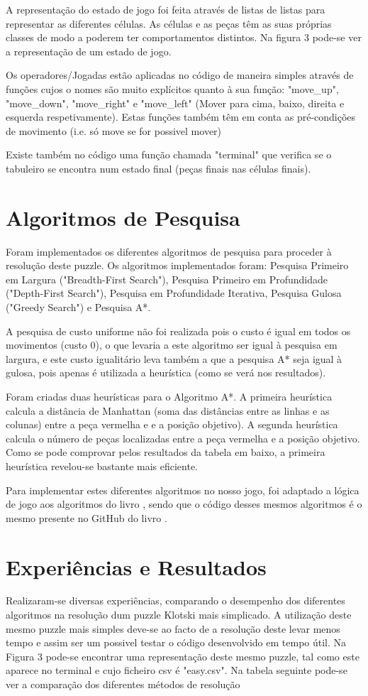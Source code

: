 \documentclass[conference]{IEEEtran}
\begin{document}
A representação do estado de jogo foi feita através de listas de listas para representar as diferentes células. As células e as peças têm as suas próprias classes de modo a poderem ter comportamentos distintos. Na figura 3 pode-se ver a representação de um estado de jogo.

Os operadores/Jogadas estão aplicadas no código de maneira simples através de funções cujos o nomes são muito explícitos quanto à sua função: "move\_up", "move\_down", "move\_right" e "move\_left" (Mover para cima, baixo, direita e esquerda respetivamente). Estas funções também têm em conta as pré-condições de movimento (i.e. só move se for possivel mover)

Existe também no código uma função chamada "terminal" que verifica se o tabuleiro se encontra num estado final (peças finais nas células finais).


\section{Algoritmos de Pesquisa}
Foram implementados os diferentes algoritmos de pesquisa para proceder à resolução deste puzzle. Os algoritmos implementados foram: Pesquisa Primeiro em Largura ("Breadth-First Search"), Pesquisa Primeiro em Profundidade ("Depth-First Search"), Pesquisa em Profundidade Iterativa, Pesquisa Gulosa ("Greedy Search") e Pesquisa A*. 

A pesquisa de custo uniforme não foi realizada pois o custo é igual em todos os movimentos (custo 0), o que levaria a este algoritmo ser igual à pesquisa em largura, e este custo igualitário leva também a que a pesquisa A* seja igual à gulosa, pois apenas é utilizada a heurística (como se verá nos resultados). 

Foram criadas duas heurísticas para o Algoritmo A*. A primeira heurística calcula a distância de Manhattan (soma das distâncias entre as linhas e as colunas) entre a peça vermelha e  e a posição objetivo). A segunda heurística calcula o número de peças localizadas entre a peça vermelha e a posição objetivo. Como se pode comprovar pelos resultados da tabela em baixo, a primeira heurística revelou-se bastante mais eficiente.

Para implementar estes diferentes algoritmos no nosso jogo, foi adaptado a lógica de jogo aos algoritmos do livro \cite{b8}, sendo que o código desses mesmos algoritmos é o mesmo presente no GitHub do livro \cite{b9}.


\section{Experiências e Resultados}
Realizaram-se diversas experiências, comparando o desempenho dos diferentes algoritmos na resolução dum puzzle Klotski mais simplicado. A utilização deste mesmo puzzle mais simples deve-se ao facto de a resolução deste levar menos tempo e assim ser um possivel testar o código desenvolvido em tempo útil. Na Figura 3 pode-se encontrar uma representação deste mesmo puzzle, tal como este aparece no terminal e cujo ficheiro csv é "easy.csv". Na tabela seguinte pode-se ver a comparação dos diferentes métodos de resolução
\end{document}
